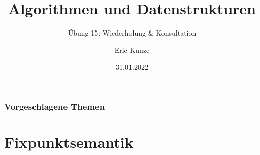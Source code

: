 \documentclass{beamer}
\begin{document}
	
	\title{Algorithmen und Datenstrukturen}
	\subtitle{Übung 15: Wiederholung \& Konsultation}
	\author{Eric Kunze}
	\date{31.01.2022}

	\maketitle


\begin{frame} \frametitle{Vorgeschlagene Themen}
	\tableofcontents
\end{frame}



\section{Fixpunktsemantik}
\end{document}
